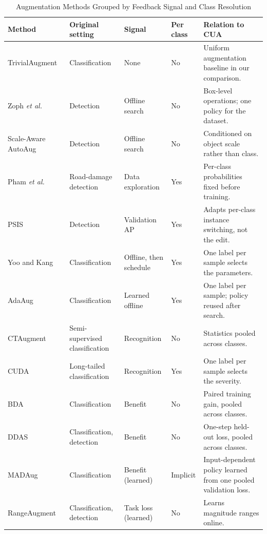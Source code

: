 \begin{table}[t]
\caption{Augmentation Methods Grouped by Feedback Signal and Class Resolution}
\label{tab:policies}
\centering
\small
\setlength{\tabcolsep}{3.5pt}
\renewcommand{\arraystretch}{1.12}
\begin{tabularx}{\textwidth}{@{}p{}p{}p{}p{}Y@{}}
\toprule
\textbf{Method} & \textbf{Original setting} & \textbf{Signal} & \textbf{Per class} & \textbf{Relation to CUA} \\
\midrule
TrivialAugment~\cite{muller2021trivial} & Classification & None & No & Uniform augmentation baseline in our comparison. \\
Zoph \emph{et al.}~\cite{zoph2020det} & Detection & Offline search & No & Box-level operations; one policy for the dataset. \\
Scale-Aware AutoAug~\cite{chen2021scale} & Detection & Offline search & No & Conditioned on object scale rather than class. \\
Pham \emph{et al.}~\cite{rdd_detectron2} & Road-damage detection & Data exploration & Yes & Per-class probabilities fixed before training. \\
PSIS~\cite{wang2019psis} & Detection & Validation AP & Yes & Adapts per-class instance switching, not the edit. \\
Yoo and Kang~\cite{yoo2023} & Classification & Offline, then schedule & Yes & One label per sample selects the parameters. \\
AdaAug~\cite{cheung2022adaaug} & Classification & Learned offline & Yes & One label per sample; policy reused after search. \\
CTAugment~\cite{berthelot2020} & Semi-supervised classification & Recognition & No & Statistics pooled across classes. \\
CUDA~\cite{ahn2023cuda} & Long-tailed classification & Recognition & Yes & One label per sample selects the severity. \\
BDA~\cite{lu2023bda} & Classification & Benefit & No & Paired training gain, pooled across classes. \\
DDAS~\cite{liu2021ddas} & Classification, detection & Benefit & No & One-step held-out loss, pooled across classes. \\
MADAug~\cite{hou2023madaug} & Classification & Benefit (learned) & Implicit & Input-dependent policy learned from one pooled validation loss. \\
RangeAugment~\cite{mehta2022rangeaugment} & Classification, detection & Task loss (learned) & No & Learns magnitude ranges online. \\

\end{tabularx}
\end{table}
